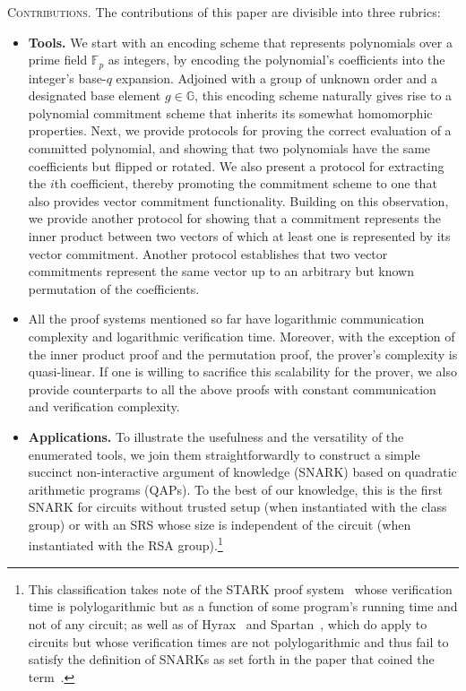 \documentclass{article}
\begin{document}
\vspace{0.25cm}
\textsc{Contributions.} The contributions of this paper are divisible into three rubrics:
\begin{itemize}
    \item[] \textbf{Tools.} We start with an encoding scheme that represents polynomials over a prime field $\mathbb{F}_p$ as integers, by encoding the polynomial's coefficients into the integer's base-$q$ expansion. Adjoined with a group of unknown order and a designated base element $g \in \mathbb{G}$, this encoding scheme naturally gives rise to a polynomial commitment scheme that inherits its somewhat homomorphic properties. Next, we provide protocols for proving the correct evaluation of a committed polynomial, and showing that two polynomials have the same coefficients but flipped or rotated. We also present a protocol for extracting the $i$th coefficient, thereby promoting the commitment scheme to one that also provides vector commitment functionality. Building on this observation, we provide another protocol for showing that a commitment represents the inner product between two vectors of which at least one is represented by its vector commitment. Another protocol establishes that two vector commitments represent the same vector up to an arbitrary but known permutation of the coefficients.
    \item[] All the proof systems mentioned so far have logarithmic communication complexity and logarithmic verification time. Moreover, with the exception of the inner product proof and the permutation proof, the prover's complexity is quasi-linear. If one is willing to sacrifice this scalability for the prover, we also provide counterparts to all the above proofs with constant communication and verification complexity.
    \item[] \textbf{Applications.} To illustrate the usefulness and the versatility of the enumerated tools, we join them straightforwardly to construct a simple succinct non-interactive argument of knowledge (SNARK) based on quadratic arithmetic programs (QAPs). To the best of our knowledge, this is the first SNARK for circuits without trusted setup (when instantiated with the class group) or with an SRS whose size is independent of the circuit (when instantiated with the RSA group).\footnote{This classification takes note of the STARK proof system~\cite{C:BBHR19} whose verification time is polylogarithmic but as a function of some program's running time and not of any circuit; as well as of Hyrax~\cite{SP:WTTW17} and Spartan~\cite{eprint:Setty19}, which do apply to circuits but whose verification times are not polylogarithmic and thus fail to satisfy the definition of SNARKs as set forth in the paper that coined the term~\cite{JC:BCCGLRT17}.}

\end{itemize}
\end{document}
